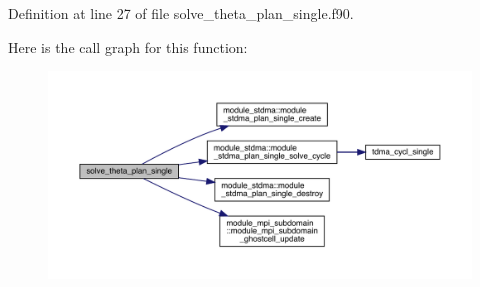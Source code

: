 Definition at line 27 of file solve\+\_\+theta\+\_\+plan\+\_\+single.\+f90.

Here is the call graph for this function\+:\nopagebreak
\begin{figure}[H]
\begin{center}
\leavevmode
\includegraphics[width=350pt]{solve__theta__plan__single_8f90_a53ef6756822306f33a47be6a66232862_cgraph}
\end{center}
\end{figure}
